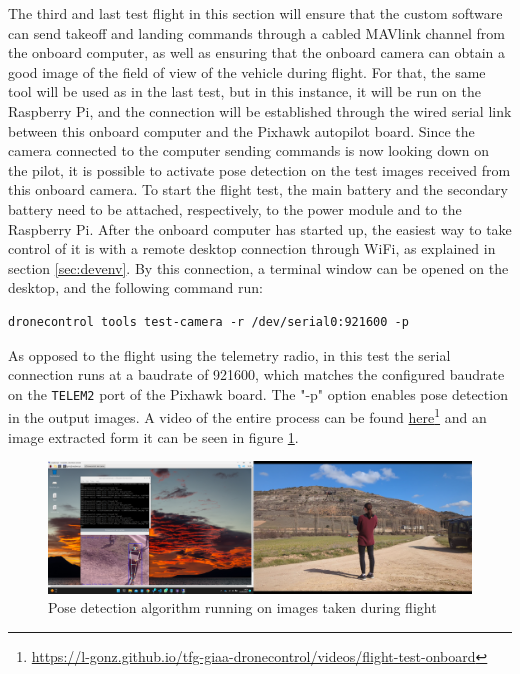 The third and last test flight in this section will ensure that the custom software can send takeoff and landing commands through a cabled MAVlink channel from the onboard computer,
as well as ensuring that the onboard camera can obtain a good image of the field of view of the vehicle during flight.
For that, the same tool will be used as in the last test, 
but in this instance, it will be run on the Raspberry Pi, and the connection will be established through the wired serial link between this onboard computer and the Pixhawk autopilot board.
Since the camera connected to the computer sending commands is now looking down on the pilot, it is possible to activate pose detection on the test images received from this onboard camera.
To start the flight test, the main battery and the secondary battery need to be attached, respectively, to the power module and to the Raspberry Pi.
After the onboard computer has started up, the easiest way to take control of it is with a remote desktop connection through WiFi, as explained in section \ref{sec:devenv}.
By this connection, a terminal window can be opened on the desktop, and the following command run:
\begin{verbatim}
dronecontrol tools test-camera -r /dev/serial0:921600 -p
\end{verbatim}
As opposed to the flight using the telemetry radio, in this test the serial connection runs at a baudrate of 921600, which matches the configured baudrate on the \texttt{TELEM2} port of the Pixhawk board.
The "-p" option enables pose detection in the output images.
A video of the entire process can be found \href{https://l-gonz.github.io/tfg-giaa-dronecontrol/videos/flight-test-onboard}{here}\footnote{\url{https://l-gonz.github.io/tfg-giaa-dronecontrol/videos/flight-test-onboard}} and an image extracted form it can be seen in figure \ref{fig:flight-test-cam-onboard}.


\begin{figure}
  \centering
  \includegraphics[width=\textwidth, keepaspectratio]{img/video-field-test-onboard.png}
  \caption{Pose detection algorithm running on images taken during flight}
  \label{fig:flight-test-cam-onboard}
\end{figure}


